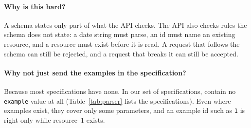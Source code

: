 \paragraph{Why is this hard?} A schema states only part of what the API
checks. The API also checks rules the schema does not state: a date string
must parse, an id must name an existing resource, and a resource must exist
before it is read. A request that follows the schema can still be rejected,
and a request that breaks it can still be accepted.

\paragraph{Why not just send the examples in the specification?} Because
most specifications have none. In our set of \NSpecs specifications,
\NSpecsWithoutExamples contain no \texttt{example} value at all
(Table~\ref{tab:parser} lists the specifications). Even where examples exist,
they cover only some parameters, and an example id such as \texttt{1} is
right only while resource~1 exists.
